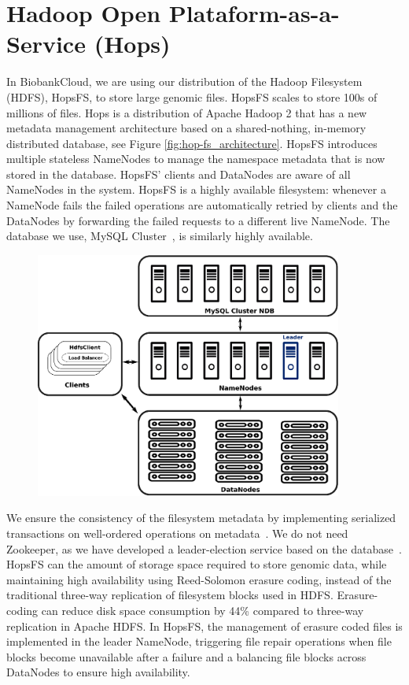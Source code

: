 \section{Hadoop Open Plataform-as-a-Service (Hops)}
In BiobankCloud, we are using our distribution of the Hadoop Filesystem (HDFS), HopsFS, to store large genomic files. HopsFS scales to store 100s of millions of files. Hops is a distribution of Apache Hadoop 2 that has a new metadata management architecture based on a shared-nothing, in-memory distributed database, see Figure \ref{fig:hop-fs_architecture}. HopsFS introduces multiple stateless NameNodes to manage the namespace metadata that is now stored in the database. HopsFS' clients and DataNodes are aware of all NameNodes in the system. HopsFS is a highly available filesystem: whenever a NameNode fails the failed operations are automatically retried by clients and the DataNodes by forwarding the failed requests to a different live NameNode. The database we use, MySQL Cluster~\cite{ronstrom2005recovery}, is similarly highly available.

\begin{figure}[h]
 \centering
 \includegraphics[width=0.9\textwidth]{./imgs/hops-fs-arch.eps}
\end{figure}

We ensure the consistency of the filesystem metadata by implementing serialized transactions on well-ordered operations on metadata~\cite{hops_consistency}. We do not need Zookeeper, as we have developed a leader-election service based on the database~\cite{hopselection}. HopsFS can the amount of storage space required to store genomic data, while maintaining high availability using Reed-Solomon erasure coding, instead of the traditional three-way replication of filesystem blocks used in HDFS. Erasure-coding can reduce disk space consumption by 44\% compared to three-way replication in Apache HDFS. In HopsFS, the management of erasure coded files is implemented in the leader NameNode, triggering file repair operations when file blocks become unavailable after a failure and a balancing file blocks across DataNodes to ensure high availability.


